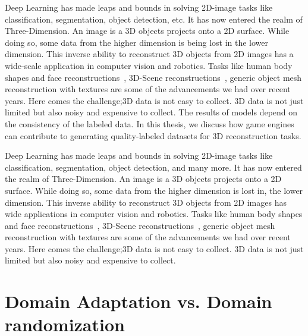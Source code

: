 Deep Learning has made leaps and bounds in solving 2D-image tasks like classification, segmentation, object detection, etc.
It has now entered the realm of Three-Dimension.
An image is a 3D objects projects onto a 2D surface.
While doing so, some data from the higher dimension is being lost in the lower dimension.
This inverse ability to reconstruct 3D objects from 2D images has a wide-scale application in computer vision and robotics.
Tasks like human body shapes and face reconstructions~\cite{deng2019accurate,Guo20193DFace,Afzal2020,Richardson2016,Richardson2017LearningDF},
3D-Scene reconstructions~\cite{Denninger20203DSR,Song2017SemanticSC,Li2019,Shin20193DSR}, generic object mesh reconstruction with textures are some of the advancements we had over recent years.
Here comes the challenge;3D data is not easy to collect.
3D data is not just limited but also noisy and expensive to collect.
The results of models depend on the consistency of the labeled data.
In this thesis, we discuss how game engines can contribute to generating quality-labeled datasets for 3D reconstruction tasks.

Deep Learning has made leaps and bounds in solving 2D-image tasks like classification, segmentation, object detection, and many more.
It has now entered the realm of Three-Dimension.
An image is a 3D objects projects onto a 2D surface.
While doing so, some data from the higher dimension is lost in, the lower dimension.
This inverse ability to reconstruct 3D objects from 2D images has wide applications in computer vision and robotics.
Tasks like human body shapes and face reconstructions~\cite{deng2019accurate,Guo20193DFace,Afzal2020,Richardson2016,Richardson2017LearningDF},
3D-Scene reconstructions~\cite{Denninger20203DSR,Song2017SemanticSC,Li2019,Shin20193DSR},
generic object mesh reconstruction with textures are some of the advancements we had over recent years.
Here comes the challenge;3D data is not easy to collect.
3D data is not just limited but also noisy and expensive to collect.

\section{Domain Adaptation vs. Domain randomization} \label{sec:da vs dr}


